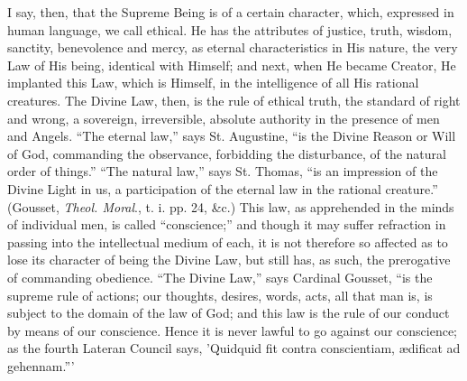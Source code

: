 I say, then, that the Supreme Being is of a certain character, which,
expressed in human language, we call ethical. He has the attributes of
justice, truth, wisdom, sanctity, benevolence and mercy, as eternal
characteristics in His nature, the very Law of His being, identical with
Himself; and next, when He became Creator, He implanted this Law, which
is Himself, in the intelligence of all His rational creatures. The
Divine Law, then, is the rule of ethical truth, the standard of right
and wrong, a sovereign, irreversible, absolute authority in the presence
of men and Angels. ``The eternal law,'' says St. Augustine,
``is the Divine Reason or Will of God, commanding the
observance, forbidding the disturbance, of the natural order of
things.'' ``The natural law,'' says St. Thomas, ``is an
impression of the Divine Light in us, a participation of the eternal law
in the rational creature.'' (Gousset, \emph{Theol. Moral}., t. i.
pp. 24, \&c.) This law, as apprehended in the minds of individual
men, is called ``conscience;'' and though it may suffer
refraction in passing into the intellectual medium of each, it is not
therefore so affected as to lose its character of being the Divine Law,
but still has, as such, the prerogative of commanding obedience.
``The Divine Law,'' says Cardinal Gousset, ``is the supreme
rule of actions; our thoughts, desires, words, acts, all that man is, is
subject to the domain of the law of God; and this law is the rule of our
conduct by means of our conscience. Hence it is never lawful to go
against our conscience; as the fourth Lateran Council says, 'Quidquid
fit contra conscientiam, ædificat ad gehennam.'''


